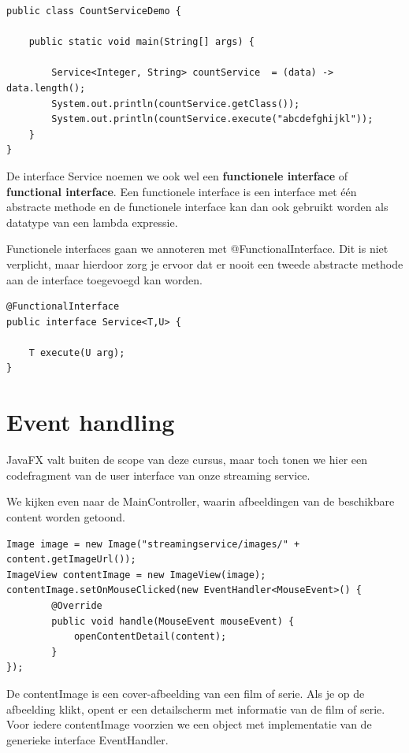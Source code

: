 \documentclass{tstextbook}
\begin{document}
\begin{lstlisting}
public class CountServiceDemo {

	public static void main(String[] args) {

		Service<Integer, String> countService  = (data) -> data.length();
		System.out.println(countService.getClass());
		System.out.println(countService.execute("abcdefghijkl"));
	}
}
\end{lstlisting}

De interface Service noemen we ook wel een \textbf{functionele interface} of \textbf{functional interface}. Een functionele interface is een interface met \'e\'en abstracte methode en de functionele interface kan dan ook gebruikt worden als datatype van een lambda expressie.

Functionele interfaces gaan we annoteren met @FunctionalInterface. Dit is niet verplicht, maar hierdoor zorg je ervoor dat er nooit een tweede abstracte methode aan de interface toegevoegd kan worden.  

\begin{lstlisting}
@FunctionalInterface
public interface Service<T,U> {

	T execute(U arg);
}
\end{lstlisting}

\section{Event handling}

JavaFX valt buiten de scope van deze cursus, maar toch tonen we hier een codefragment van de user interface van onze streaming service.

We kijken even naar de MainController, waarin afbeeldingen van de beschikbare content worden getoond.

\begin{lstlisting}
Image image = new Image("streamingservice/images/" + content.getImageUrl());
ImageView contentImage = new ImageView(image);
contentImage.setOnMouseClicked(new EventHandler<MouseEvent>() {
		@Override
		public void handle(MouseEvent mouseEvent) {
			openContentDetail(content);
		}
});
\end{lstlisting}

De contentImage is een cover-afbeelding van een film of serie. Als je op de afbeelding klikt, opent er een detailscherm met informatie van de film of serie.
Voor iedere contentImage voorzien we een object met implementatie van de generieke interface EventHandler.
\end{document}
